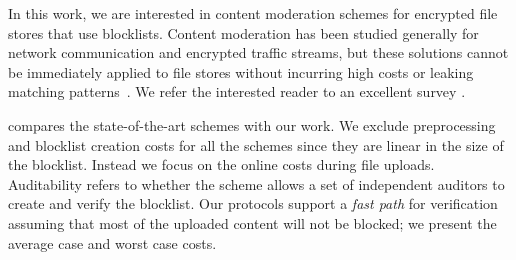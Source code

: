 




In this work, we are interested in content moderation schemes for encrypted file stores that use blocklists. Content moderation has been studied generally for network communication and encrypted traffic streams, but these solutions cannot be immediately applied to file stores without
incurring high costs or leaking matching
patterns~\cite{sherry2015blindbox, ning2019privdpi, ning2020pine,
  wen2021framework}. We refer the interested reader to an
excellent survey \cite{scheffler2023sok}.



 compares the
state-of-the-art schemes with our work. We exclude preprocessing and 
blocklist creation costs for all the schemes since they are linear in the size of the 
blocklist. Instead we focus on the online costs during file uploads. Auditability refers to whether the scheme allows a set of independent auditors to create and verify the blocklist. Our protocols support a \emph{fast path} for verification assuming that most of the uploaded content will not be blocked; we present the average case and worst case costs. 





